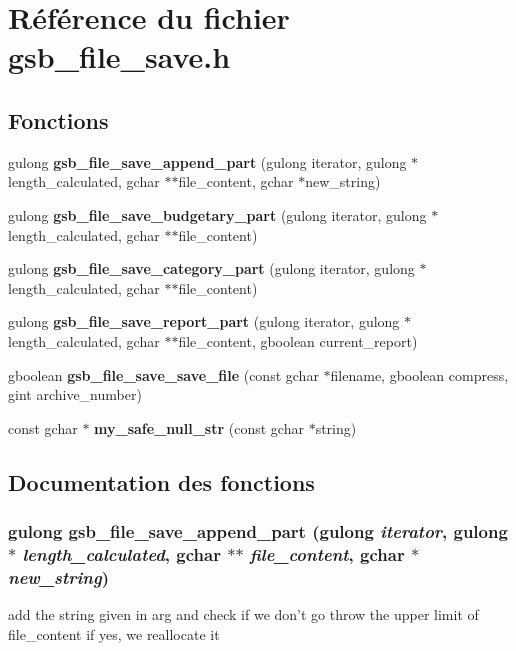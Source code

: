 \section{Référence du fichier gsb\_\-file\_\-save.h}
\label{gsb__file__save_8h}
\subsection*{Fonctions}
\begin{DoxyCompactItemize}
\item 
gulong {\bf gsb\_\-file\_\-save\_\-append\_\-part} (gulong iterator, gulong $\ast$length\_\-calculated, gchar $\ast$$\ast$file\_\-content, gchar $\ast$new\_\-string)
\item 
gulong {\bf gsb\_\-file\_\-save\_\-budgetary\_\-part} (gulong iterator, gulong $\ast$length\_\-calculated, gchar $\ast$$\ast$file\_\-content)
\item 
gulong {\bf gsb\_\-file\_\-save\_\-category\_\-part} (gulong iterator, gulong $\ast$length\_\-calculated, gchar $\ast$$\ast$file\_\-content)
\item 
gulong {\bf gsb\_\-file\_\-save\_\-report\_\-part} (gulong iterator, gulong $\ast$length\_\-calculated, gchar $\ast$$\ast$file\_\-content, gboolean current\_\-report)
\item 
gboolean {\bf gsb\_\-file\_\-save\_\-save\_\-file} (const gchar $\ast$filename, gboolean compress, gint archive\_\-number)
\item 
const gchar $\ast$ {\bf my\_\-safe\_\-null\_\-str} (const gchar $\ast$string)
\end{DoxyCompactItemize}


\subsection{Documentation des fonctions}
\subsubsection[{gsb\_\-file\_\-save\_\-append\_\-part}]{\setlength{\rightskip}{0pt plus 5cm}gulong gsb\_\-file\_\-save\_\-append\_\-part (gulong {\em iterator}, \/  gulong $\ast$ {\em length\_\-calculated}, \/  gchar $\ast$$\ast$ {\em file\_\-content}, \/  gchar $\ast$ {\em new\_\-string})}\label{gsb__file__save_8h_a53abd581b16b2e5974e4b7b8cbfbd321}
add the string given in arg and check if we don't go throw the upper limit of file\_\-content if yes, we reallocate it


